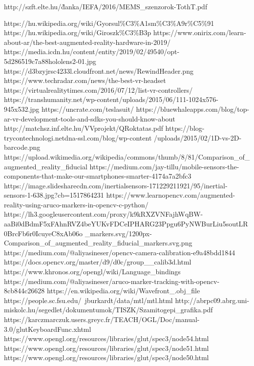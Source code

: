 

\begin{thebibliography}{21}
http://szft.elte.hu/\~danka/IEFA/2016/MEMS_szenzorok-TothT.pdf

https://hu.wikipedia.org/wiki/Gyorsul\%C3\%A1sm\%C3\%A9r\%C5\%91
https://hu.wikipedia.org/wiki/Giroszk\%C3\%B3p
https://www.onirix.com/learn-about-ar/the-best-augmented-reality-hardware-in-2019/
https://media.icdn.hu/content/entity/2019/02/49540/opt-5d286519c7a88hololens2-01.jpg
https://d3bzyjrsc4233l.cloudfront.net/news/RewindHeader.png
https://www.techradar.com/news/the-best-vr-headset
https://virtualrealitytimes.com/2016/07/12/list-vr-controllers/
https://transhumanity.net/wp-content/uploads/2015/06/111-1024x576-945x532.jpg
https://uncrate.com/teslasuit/
https://bluewhaleapps.com/blog/top-ar-vr-development-tools-and-sdks-you-should-know-about
http://matchsz.inf.elte.hu/VVprojekt/QRoktatas.pdf
https://blog-trycontechnologi.netdna-ssl.com/blog/wp-content
/uploads/2015/02/1D-vs-2D-barcode.png 
https://upload.wikimedia.org/wikipedia/commons/thumb/8/81/Comparison\_of\_augmented\_reality\_fiducial
https://medium.com/jay-tillu/mobile-sensors-the-components-that-make-our-smartphones-smarter-4174a7a2bfc3
https://image.slidesharecdn.com/inertialsensors-171229211921/95/inertial-sensors-1-638.jpg?cb=1517864231
https://www.learnopencv.com/augmented-reality-using-aruco-markers-in-opencv-c-python/
https://lh3.googleusercontent.com/proxy/k9kRXZVNFajhWqBW-aaBi0dBdmF5xFAhnRVZ4beYUKvFDCeIPHARG23Ppgu6PyNWBurLiu5soutLR0BrcFb6r0IcuyeC8xAb06o
_markers.svg/1200px-Comparison\_of\_augmented\_reality\_fiducial\_markers.svg.png
https://medium.com/@aliyasineser/opencv-camera-calibration-e9a48bdd1844
https://docs.opencv.org/master/d9/d0c/group\__calib3d.html 
https://www.khronos.org/opengl/wiki/Language\_bindings
https://medium.com/@aliyasineser/aruco-marker-tracking-with-opencv-8cb844c26628
https://en.wikipedia.org/wiki/Wavefront_.obj_file
https://people.sc.fsu.edu/~jburkardt/data/mtl/mtl.html
http://abrpc09.abrg.uni-miskolc.hu/segedlet/dokumentumok/TISZK/Szamitogepi_grafika.pdf
https://karczmarczuk.users.greyc.fr/TEACH/OGL/Doc/manual-3.0/glutKeyboardFunc.xhtml
https://www.opengl.org/resources/libraries/glut/spec3/node54.html
https://www.opengl.org/resources/libraries/glut/spec3/node51.html
https://www.opengl.org/resources/libraries/glut/spec3/node50.html
\end{thebibliography}
